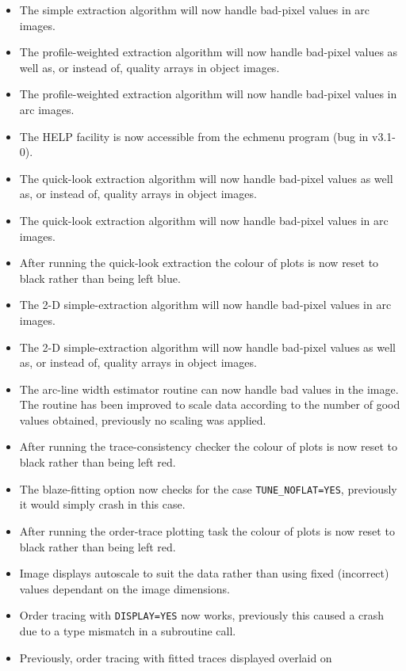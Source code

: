 \documentclass[11pt,twoside]{article}
\newcommand{\htmlref}[2]{#1}
\begin{document}
\begin{itemize}
\item The simple extraction algorithm will now handle bad-pixel values in
   arc images.
\item The profile-weighted extraction algorithm will now handle bad-pixel
   values as well as, or instead of, quality arrays in object images.
\item The profile-weighted extraction algorithm will now handle bad-pixel
   values in arc images.
\item The HELP facility is now accessible from the echmenu program (bug in
   v3.1-0).
\item The quick-look extraction algorithm will now handle bad-pixel
   values as well as, or instead of, quality arrays in object images.
\item The quick-look extraction algorithm will now handle bad-pixel
   values in arc images.
\item After running the quick-look extraction the colour of plots is now
   reset to black rather than being left blue.
\item The 2-D simple-extraction algorithm will now handle bad-pixel values
   in arc images.
\item The 2-D simple-extraction algorithm will now handle bad-pixel values
   as well as, or instead of, quality arrays in object images.
\item The arc-line width estimator routine can now handle bad values in the
   image.  The routine has been improved to scale data according to the
   number of good values obtained, previously no scaling was applied.
\item After running the trace-consistency checker the colour of plots is
   now reset to black rather than being left red.
\item The blaze-fitting option now checks for the case
   \htmlref{{\tt{TUNE\_NOFLAT=YES}}}{par_TUNE_NOFLAT},
   previously it would simply crash in this case.
\item After running the order-trace plotting task the colour of plots is
   now reset to black rather than being left red.
\item Image displays autoscale to suit the data rather than using fixed
   (incorrect) values dependant on the image dimensions.
\item Order tracing with \htmlref{{\tt{DISPLAY=YES}}}{par_DISPLAY} now works,
   previously this caused
   a crash due to a type mismatch in a subroutine call.
\item Previously, order tracing with fitted traces displayed overlaid on

\end{itemize}
\end{document}
